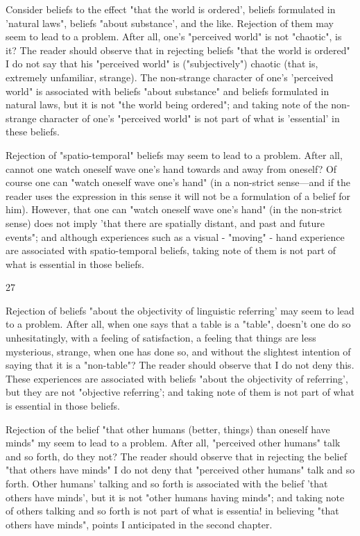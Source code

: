 \documentclass[10pt,twoside]{memoir}
\begin{document}
\begin{enumerate}
Consider beliefs to the effect "that the world is ordered', beliefs 
formulated in 'natural laws", beliefs "about substance', and the like. 
Rejection of them may seem to lead to a problem. After all, one's "perceived 
world" is not "chaotic", is it? The reader should observe that in rejecting 
beliefs "that the world is ordered" I do not say that his "perceived world" is 
("subjectively") chaotic (that is, extremely unfamiliar, strange). The 
non-strange character of one's 'perceived world" is associated with beliefs 
"about substance" and beliefs formulated in natural laws, but it is not "the 
world being ordered"; and taking note of the non-strange character of one's 
"perceived world" is not part of what is 'essential' in these beliefs. 

Rejection of "spatio-temporal" beliefs may seem to lead to a problem. 
After all, cannot one watch oneself wave one's hand towards and away from 
oneself? Of course one can "watch oneself wave one's hand" (in a non-strict 
sense---and if the reader uses the expression in this sense it will not be a 
formulation of a belief for him). However, that one can "watch oneself wave 
one's hand" (in the non-strict sense) does not imply 'that there are spatially 
distant, and past and future events"; and although experiences such as a 
visual - "moving" - hand experience are associated with spatio-temporal 
beliefs, taking note of them is not part of what is essential in those beliefs. 


27 


Rejection of beliefs "about the objectivity of linguistic referring' may 
seem to lead to a problem. After all, when one says that a table is a "table", 
doesn't one do so unhesitatingly, with a feeling of satisfaction, a feeling that 
things are less mysterious, strange, when one has done so, and without the 
slightest intention of saying that it is a "non-table"? The reader should 
observe that I do not deny this. These experiences are associated with beliefs 
"about the objectivity of referring', but they are not "objective referring'; 
and taking note of them is not part of what is essential in those beliefs. 

Rejection of the belief "that other humans (better, things) than oneself 
have minds" my seem to lead to a problem. After all, "perceived other 
humans" talk and so forth, do they not? The reader should observe that in 
rejecting the belief "that others have minds" I do not deny that "perceived 
other humans" talk and so forth. Other humans' talking and so forth is 
associated with the belief 'that others have minds', but it is not "other 
humans having minds"; and taking note of others talking and so forth is not 
part of what is essentia! in believing "that others have minds", points I 
anticipated in the second chapter. 


\end{enumerate}
\end{document}
